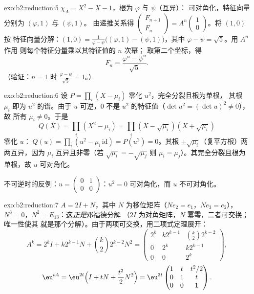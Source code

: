 \begin{solution}{exo:b2:reduction:5}
$\chi_A = X^2 - X - 1$，根为 $\varphi$ 与 $\psi$（互异）：
可对角化，特征向量分别为 $(\varphi, 1)$ 与 $(\psi, 1)$。
由递推关系得 $\begin{pmatrix} F_{n+1}\\ F_n \end{pmatrix} =
A^n \begin{pmatrix}1\\ 0\end{pmatrix}$。将 $(1, 0)$ 按
特征向量分解：$(1,0) = \frac{1}{\varphi - \psi}\bigl((\varphi, 1) -
(\psi, 1)\bigr)$，其中 $\varphi - \psi = \sqrt5$。用 $A^n$ 作用
则每个特征分量乘以其特征值的 $n$ 次幂；
取第二个坐标，得
\[
F_n = \frac{\varphi^n - \psi^n}{\sqrt 5} .
\]
（验证：$n = 1$ 时 $\frac{\varphi - \psi}{\sqrt5} = 1$。）
\end{solution}

\begin{solution}{exo:b2:reduction:6}
设 $P = \prod_i (X - \mu_i)$ 零化 $u^2$，完全分裂且根为单根，
其根 $\mu_i$ 即为 $u^2$ 的谱。由于 $u$ 可逆，$0$
不是 $u^2$ 的特征值（$\det u^2 = (\det u)^2 \neq 0$），故
所有 $\mu_i \neq 0$。于是
\[
Q(X) = \prod_i (X^2 - \mu_i) = \prod_i (X - \sqrt{\mu_i})(X +
\sqrt{\mu_i})
\]
零化 $u$：$\;Q(u) = \prod_i (u^2 - \mu_i\,\mathrm{id}) =
P(u^2) = 0$。其根 $\pm
\sqrt{\mu_i}$（复平方根）两两互异，因为
$\mu_i$ 互异且非零（若 $\sqrt{\mu_i} = -\sqrt{\mu_j}$
则 $\mu_i = \mu_j$）。其完全分裂且根为单根，故
$u$ 可对角化。

不可逆时的反例：$u = \begin{pmatrix} 0 & 1\\
0 & 0\end{pmatrix}$：$u^2 = 0$ 可对角化，而 $u$ 不可对角化。
\end{solution}

\begin{solution}{exo:b2:reduction:7}
$A = 2I + N$，其中 $N$ 为移位矩阵（$N e_2 = e_1$，$Ne_3 = e_2$），
$N^3 = 0$，$N^2 = E_{13}$：这\emph{正是}邓福德分解
（$2I$ 为对角矩阵，$N$ 幂零，二者可交换；唯一性使其
就是那个分解）。由于两项可交换，用二项式定理展开：
\[
A^k = 2^k I + k 2^{k-1} N + \binom k2 2^{k-2} N^2
= \begin{pmatrix}
2^k & k2^{k-1} & \binom k2 2^{k-2}\\
0 & 2^k & k2^{k-1}\\
0 & 0 & 2^k
\end{pmatrix},
\]
\[
\eu^{tA} = \eu^{2t}\Bigl(I + tN + \frac{t^2}{2}N^2\Bigr)
= \eu^{2t}\begin{pmatrix}
1 & t & t^2/2\\
0 & 1 & t\\
0 & 0 & 1
\end{pmatrix}.
\]
\end{solution}

